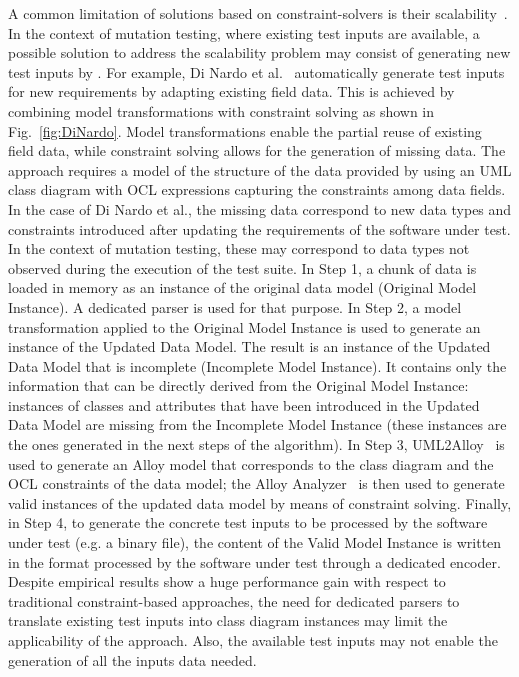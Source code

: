 A common limitation of solutions based on constraint-solvers is their scalability~\cite{di2017augmenting}. In the context of mutation testing, where existing test inputs are available, a possible solution to address the scalability problem may consist of generating new test inputs by .
For example, Di Nardo et al.~\cite{di2017augmenting} automatically generate test inputs for new requirements by adapting existing field data.
This is achieved by combining model transformations with constraint solving as shown in Fig.~\ref{fig:DiNardo}.
Model transformations enable the partial reuse of existing field data, while constraint solving allows for the generation of missing data. The approach requires a model of the structure of the data provided by using an UML class diagram with OCL expressions capturing the constraints among data fields. In the case of Di Nardo et al., the missing data correspond to new data types and constraints introduced after updating the requirements of the software under test. In the context of mutation testing, these may correspond to data types not observed during the execution of the test suite.
In Step 1, a chunk of data is loaded in memory as an instance of the original data model (Original Model Instance).
A dedicated parser is used for that purpose.
In Step 2, a model transformation applied to the Original Model Instance is used to generate an instance of the Updated Data Model. The result is an instance of the Updated Data Model that is incomplete (Incomplete Model Instance).
It contains only the information that can be directly derived from the Original Model Instance:
instances of classes and attributes that have been introduced in the Updated Data Model are missing from the Incomplete Model Instance (these instances are the ones generated in the next steps of the algorithm).
In Step 3, UML2Alloy~\cite{Uml2alloy} is used to generate an Alloy model that corresponds to the class diagram and the OCL constraints of the data model; the Alloy Analyzer~\cite{AlloyWeb} is then used to generate  valid instances of the updated data model by means of constraint solving. 
Finally, in Step 4, to generate the concrete test inputs to be processed by the software under test (e.g. a binary file), the content of the Valid Model Instance is written in the format processed by the software under test through a dedicated encoder.
Despite empirical results show a huge performance gain with respect to traditional constraint-based approaches, the need for dedicated parsers to translate existing test inputs into class diagram instances may limit the applicability of the approach. Also, the available test inputs may not enable the generation of all the inputs data needed.


